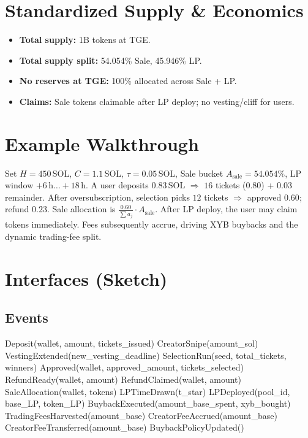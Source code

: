 \documentclass[10pt,twocolumn]{article}
\newcommand{\Hcap}{450}            %
\newcommand{\Ccap}{1.1}            %
\newcommand{\TauVal}{0.05}         %
\newcommand{\LPWinStart}{6}        %
\newcommand{\LPWinEnd}{18}         %
\newcommand{\SalePct}{54.054}      %
\begin{document}
\section*{Standardized Supply \& Economics}
\begin{itemize}
  \item \textbf{Total supply:} 1B tokens at TGE.
  \item \textbf{Total supply split:} 54.054\% Sale, 45.946\% LP.
  \item \textbf{No reserves at TGE:} 100\% allocated across Sale + LP.
  \item \textbf{Claims:} Sale tokens claimable after LP deploy; no vesting/cliff for users.
\end{itemize}

\section*{Example Walkthrough}
Set $H{=}\Hcap$\,SOL, $C{=}\Ccap$\,SOL, $\tau{=}\TauVal$\,SOL, Sale bucket $A_{\text{sale}}{=}\SalePct\%$, LP window $+\LPWinStart$\,h$\ldots+\LPWinEnd$\,h. A user deposits $0.83$\,SOL $\Rightarrow$ $16$ tickets ($0.80$) + $0.03$ remainder. After oversubscription, selection picks $12$ tickets $\Rightarrow$ approved $0.60$; refund $0.23$. Sale allocation is $\frac{0.60}{\sum a_j} \cdot A_{\text{sale}}$. After LP deploy, the user may claim tokens immediately. Fees subsequently accrue, driving \textdollar XYB buybacks and the dynamic trading-fee split.

\section*{Interfaces (Sketch)}

\subsection*{Events}
\begin{code}
Deposit(wallet, amount, tickets_issued)
CreatorSnipe(amount_sol)
VestingExtended(new_vesting_deadline)
SelectionRun(seed, total_tickets, winners)
Approved(wallet, approved_amount, tickets_selected)
RefundReady(wallet, amount)
RefundClaimed(wallet, amount)
SaleAllocation(wallet, tokens)
LPTimeDrawn(t_star)
LPDeployed(pool_id, base_LP, token_LP)
BuybackExecuted(amount_base_spent, xyb_bought)
TradingFeesHarvested(amount_base)
CreatorFeeAccrued(amount_base)
CreatorFeeTransferred(amount_base)
BuybackPolicyUpdated()
\end{code}
\end{document}
